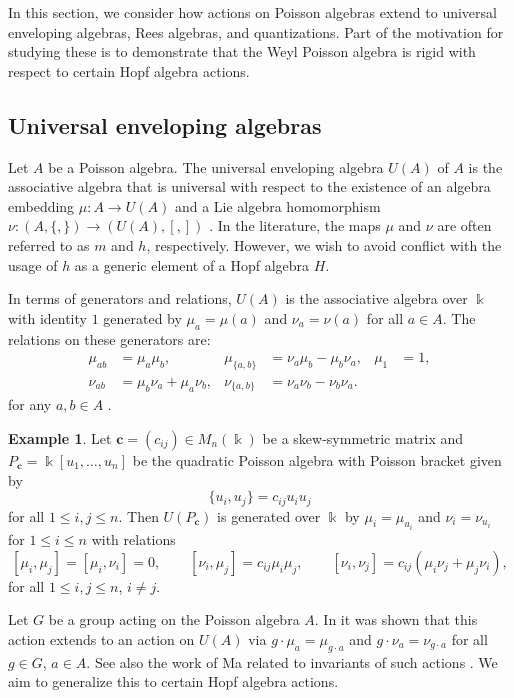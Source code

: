 \documentclass[reqno]{amsart}
\numberwithin{equation}{section}
\theoremstyle{definition}
\newtheorem{example}[theorem]{Example}
\newcommand\kk{\Bbbk}
\newcommand\bc{\mathbf c}
\newcommand\PC{P_\bc}
\begin{document}
In this section, we consider how actions on Poisson algebras extend to universal enveloping algebras, Rees algebras, and quantizations. Part of the motivation for studying these is to demonstrate that the Weyl Poisson algebra is rigid with respect to certain Hopf algebra actions.

\subsection{Universal enveloping algebras}

Let $A$ be a Poisson algebra. The universal enveloping algebra $U(A)$ of $A$ is the associative algebra that is universal with respect to the existence of an algebra embedding $\mu:A \to U(A)$ and a Lie algebra homomorphism $\nu:(A,\{,\}) \to (U(A),[,])$ \cite{OH3}. In the literature, the maps $\mu$ and $\nu$ are often referred to as $m$ and $h$, respectively. However, we wish to avoid conflict with the usage of $h$ as a generic element of a Hopf algebra $H$.

In terms of generators and relations, $U(A)$ is the associative algebra over $\kk$ with identity $1$ generated by $\mu_a = \mu(a)$ and $\nu_a = \nu(a)$ for all $a \in A$. The relations on these generators are:
\begin{align*}
\mu_{ab}&= \mu_a\mu_b, &
\mu_{\{a,b\}}&=\nu_a\mu_b-\mu_b\nu_a, & 
\mu_1 &= 1, \\
\nu_{ab}&=\mu_b\nu_a + \mu_a\nu_b, &
\nu_{\{a,b\}}&=\nu_a\nu_b-\nu_b\nu_a.
\end{align*}
for any $a,b\in A$ \cite{UU}.

\begin{example}\label{ex.skewsym}
Let $\bc=(c_{ij})\in M_n(\kk)$ be a skew-symmetric matrix and $\PC=\kk[u_1,\ldots,u_n]$ be the quadratic Poisson algebra with Poisson bracket given by 
\[ \{u_i,u_j\} = c_{ij}u_iu_j \]
for all $1\leq i,j\leq n$. Then $U(\PC)$ is generated over $\kk$ by $\mu_i=\mu_{u_i}$ and $\nu_i = \nu_{u_i}$ for $1\leq i\leq n$ with relations
\[
[\mu_i,\mu_j] = [\mu_i,\nu_i] = 0, \qquad
[\nu_i,\mu_j] = c_{ij} \mu_i \mu_j, \qquad
[\nu_i,\nu_j] = c_{ij} (\mu_i\nu_j + \mu_j\nu_i),
\]
for all $1\leq i,j\leq n$, $i \neq j$.
\end{example}

Let $G$ be a group acting on the Poisson algebra $A$. In \cite{GVW} it was shown that this action extends to an action on $U(A)$ via $g \cdot \mu_a = \mu_{g \cdot a}$ and $g \cdot \nu_a = \nu_{g \cdot a}$ for all $g \in G$, $a \in A$. See also the work of Ma related to invariants of such actions \cite{cma1}. We aim to generalize this to certain Hopf algebra actions.
\end{document}
